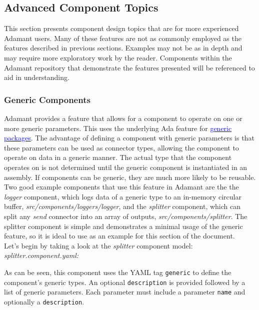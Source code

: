 \subsection{Advanced Component Topics}

This section presents component design topics that are for more experienced Adamant users. Many of these features are not as commonly employed as the features described in previous sections. Examples may not be as in depth and may require more exploratory work by the reader. Components within the Adamant repository that demonstrate the features presented will be referenced to aid in understanding.

\subsubsection{Generic Components}

Adamant provides a feature that allows for a component to operate on one or more generic parameters. This uses the underlying Ada feature for \href{https://learn.adacore.com/courses/intro-to-ada/chapters/generics.html}{\textcolor{blue}{generic packages}}. The advantage of defining a component with generic parameters is that these parameters can be used as connector types, allowing the component to operate on data in a generic manner. The actual type that the component operates on is not determined until the generic component is instantiated in an assembly. If components can be generic, they are much more likely to be reusable. \\

Two good example components that use this feature in Adamant are the the \textit{logger} component, which logs data of a generic type to an in-memory circular buffer, \textit{src/components/loggers/logger}, and the \textit{splitter} component, which can split any \textit{send} connector into an array of outputs, \textit{src/components/splitter}. The splitter component is simple and demonstrates a minimal usage of the generic feature, so it is ideal to use as an example for this section of the document. \\

Let's begin by taking a look at the \textit{splitter} component model: \\

\textit{splitter.component.yaml:} 

As can be seen, this component uses the YAML tag \texttt{generic} to define the component's generic types. An optional \texttt{description} is provided followed by a list of generic parameters. Each parameter must include a parameter \texttt{name} and optionally a \texttt{description}. \\

